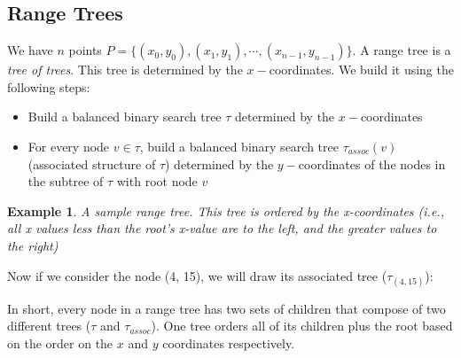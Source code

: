 \documentclass{report}
\newtheorem{ex}{Example}[section]
\begin{document}
\subsection{Range Trees}
We have $n$ points $P = \{(x_0, y_0), (x_1, y_1), \cdots, (x_{n-1}, y_{n-1})\}$. A range tree is a \textit{tree of trees}. This tree is determined by the $x-$coordinates. We build it using the following steps:
\begin{itemize}
\item Build a balanced binary search tree $\tau$ determined by the $x-$coordinates
\item For every node $v \in \tau$, build a balanced binary search tree $\tau_{assoc}(v)$ (associated structure of $\tau$) determined by the $y-$coordinates of the nodes in the subtree of $\tau$ with root node $v$
\end{itemize}
\begin{ex}
A sample range tree. This tree is ordered by the x-coordinates (i.e., all x values less than the root's x-value are to the left, and the greater values to the right)
\end{ex}
\begin{center}
\end{center}
Now if we consider the node (4, 15), we will draw its associated tree ($\tau_{(4, 15)}$):
\begin{center}
\end{center}
In short, every node in a range tree has two sets of children that compose of two different trees ($\tau$ and $\tau_{assoc}$). One tree orders all of its children plus the root based on the order on the $x$ and $y$ coordinates respectively.
\end{document}
